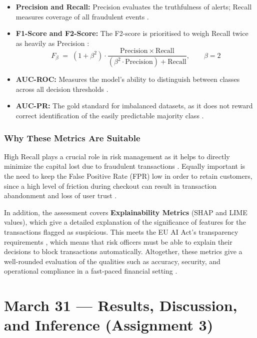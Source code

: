\documentclass[12pt, a4paper]{article}
\begin{document}
\begin{itemize}[leftmargin=2em, itemsep=4pt]
  \item \textbf{Precision and Recall:} Precision evaluates the truthfulness of alerts; Recall measures coverage of all fraudulent events \cite{mlfraudreview2023}.
  \item \textbf{F1-Score and F2-Score:} The F2-score is prioritised to weigh Recall twice as heavily as Precision \cite{ieeeaccess2025drift}:
  \[
    F_\beta \;=\; (1 + \beta^2) \cdot \frac{\mathrm{Precision} \times \mathrm{Recall}}{(\beta^2 \cdot \mathrm{Precision}) + \mathrm{Recall}}, \qquad \beta = 2
  \]
  \item \textbf{AUC-ROC:} Measures the model's ability to distinguish between classes across all decision thresholds \cite{mlfraudreview2023}.
  \item \textbf{AUC-PR:} The gold standard for imbalanced datasets, as it does not reward correct identification of the easily predictable majority class \cite{fraudbenchmark2022}.
\end{itemize}
 
\subsubsection*{Why These Metrics Are Suitable}
 
High Recall plays a crucial role in risk management as it helps to directly minimize the capital lost due to fraudulent transactions \cite{flfraudreview2024}. Equally important is the need to keep the False Positive Rate (FPR) low in order to retain customers, since a high level of friction during checkout can result in transaction abandonment and loss of user trust \cite{mlfraudreview2023}.

In addition, the assessment covers \textbf{Explainability Metrics} (SHAP \cite{shap2017} and LIME values), which give a detailed explanation of the significance of features for the transactions flagged as suspicious. This meets the EU AI Act's transparency requirements \cite{euaiact2024}, which means that risk officers must be able to explain their decisions to block transactions automatically. Altogether, these metrics give a well-rounded evaluation of the qualities such as accuracy, security, and operational compliance in a fast-paced financial setting \cite{gnndigitalpayment2025}.

\section{March 31 --- Results, Discussion, and Inference (Assignment 3)}
\end{document}
